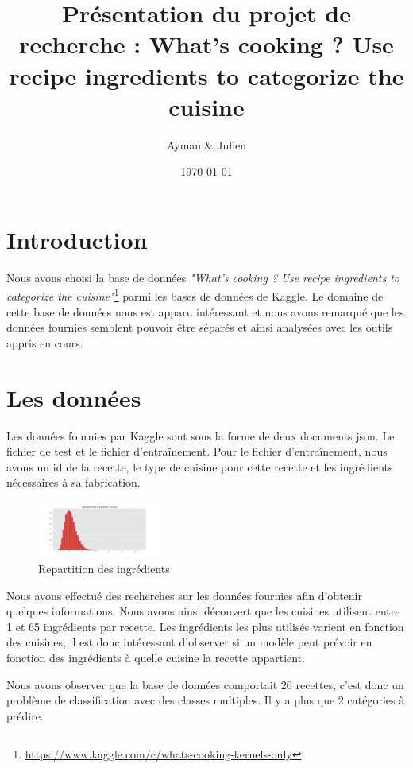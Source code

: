 \documentclass[12pt]{article}
\title{Présentation du projet de recherche : 
What's cooking ? Use recipe ingredients to categorize the cuisine
}
\author{Ayman \bsc{Hamzaoui} \& Julien \bsc{Delaunay}}
\date{\today}
\begin{document}
\maketitle
\newpage
\tableofcontents

\newpage
\section{Introduction}
Nous avons choisi la base de données \textit{"What's cooking ? Use recipe ingredients to categorize the cuisine"}\footnote{\url{https://www.kaggle.com/c/whats-cooking-kernels-only}} parmi les bases de données de Kaggle. Le domaine de cette base de données nous est apparu intéressant et nous avons remarqué que les données fournies semblent pouvoir être séparés et ainsi analysées avec les outils appris en cours.

\section{Les données}
Les données fournies par Kaggle sont sous la forme de deux documents json. Le fichier de test et le fichier d'entraînement. Pour le fichier d'entraînement, nous avons un id de la recette, le type de cuisine pour cette recette et les ingrédients nécessaires à sa fabrication. 

\begin{figure}
	\includegraphics[width=4cm]{./repartitions_ingredients.png}
	\caption{Repartition des ingrédients}
	\label{label-image1}
\end{figure}
Nous avons effectué des recherches sur les données fournies afin d'obtenir quelques informations. Nous avons ainsi découvert que les cuisines utilisent entre 1 et 65 ingrédients par recette. Les ingrédients les plus utilisés varient en fonction des cuisines, il est donc intéressant d'observer si un modèle peut prévoir en fonction des ingrédients à quelle cuisine la recette appartient.

Nous avons observer que la base de données comportait 20 recettes, c'est donc un problème de classification avec des classes multiples. Il y a plus que 2 catégories à prédire.
\end{document}
